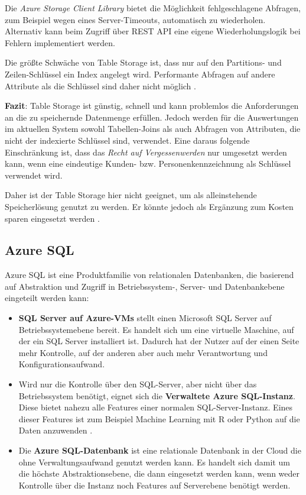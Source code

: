 Die \textit{Azure Storage Client Library} bietet die Möglichkeit fehlgeschlagene Abfragen, zum Beispiel wegen eines Server-Timeouts, automatisch zu wiederholen. Alternativ kann beim Zugriff über REST API eine eigene Wiederholungslogik bei Fehlern implementiert werden.

Die größte Schwäche von Table Storage ist, dass nur auf den Partitions- und Zeilen-Schlüssel ein Index angelegt wird. Performante Abfragen auf andere Attribute als die Schlüssel sind daher nicht möglich \cite{reagan_web_2018}.

\textbf{Fazit}: Table Storage ist günstig, schnell und kann problemlos die Anforderungen an die zu speichernde Datenmenge erfüllen. Jedoch werden für die Auswertungen im aktuellen System sowohl Tabellen-Joins als auch Abfragen von Attributen, die nicht der indexierte Schlüssel sind, verwendet. Eine daraus folgende Einschränkung ist, dass das \textit{Recht auf Vergessenwerden} nur umgesetzt werden kann, wenn eine eindeutige Kunden- bzw. Personenkennzeichnung als Schlüssel verwendet wird.

Daher ist der Table Storage hier nicht geeignet, um als alleinstehende Speicherlösung genutzt zu werden. Er könnte jedoch als Ergänzung zum Kosten sparen eingesetzt werden \cite[vgl.][]{reagan_web_2018}. 


\subsection{Azure SQL} \label{sec:grundlagen:azure_dienste:sql}
Azure SQL ist eine Produktfamilie von relationalen Datenbanken, die basierend auf Abstraktion und Zugriff in Betriebssystem-, Server- und Datenbankebene eingeteilt werden kann:

\begin{itemize}
\item \textbf{SQL Server auf Azure-VMs} stellt einen Microsoft SQL Server auf Betriebssystemebene bereit. Es handelt sich um eine virtuelle Maschine, auf der ein SQL Server installiert ist. Dadurch hat der Nutzer auf der einen Seite mehr Kontrolle, auf der anderen aber auch mehr Verantwortung und Konfigurationsaufwand. 
\item Wird nur die Kontrolle über den SQL-Server, aber nicht über das Betriebssystem benötigt, eignet sich die \textbf{Verwaltete Azure SQL-Instanz}. Diese bietet nahezu alle Features einer normalen SQL-Server-Instanz. Eines dieser Features ist zum Beispiel Machine Learning mit R oder Python auf die Daten anzuwenden \cite{ericson_was_2021}.
\item Die \textbf{Azure SQL-Datenbank} ist eine relationale Datenbank in der Cloud die ohne Verwaltungsaufwand genutzt werden kann. Es handelt sich damit um die höchste Abstraktionsebene, die dann eingesetzt werden kann, wenn weder Kontrolle über die Instanz noch Features auf Serverebene benötigt werden.
\end{itemize}
\cite{mauri_azure_2021}

